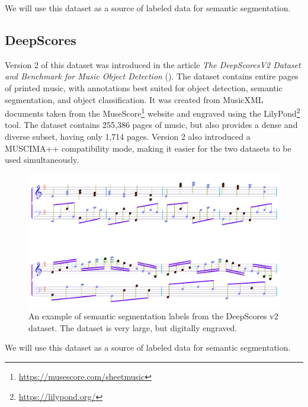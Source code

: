 We will use this dataset as a source of labeled data for semantic segmentation.


\subsection{DeepScores}

Version 2 of this dataset was introduced in the article \emph{The DeepScoresV2 Dataset and Benchmark for Music Object Detection} (\cite{DeepScores}). The dataset contains entire pages of printed music, with annotations best suited for object detection, semantic segmentation, and object classification. It was created from MusicXML documents taken from the MuseScore\footnote{\url{https://musescore.com/sheetmusic}} website and engraved using the LilyPond\footnote{\url{https://lilypond.org/}} tool. The dataset contains 255,386 pages of music, but also provides a dense and diverse subset, having only 1,714 pages. Version 2 also introduced a MUSCIMA++ compatibility mode, making it easier for the two datasets to be used simultaneously.

\begin{figure}[ht]
    \centering
    \includegraphics[width=145mm]{../img/deepscores.png}
    \caption{An example of semantic segmentation labels from the DeepScores v2 dataset. The dataset is very large, but digitally engraved.}
    \label{fig:DeepScoresV2}
\end{figure}

We will use this dataset as a source of labeled data for semantic segmentation.
